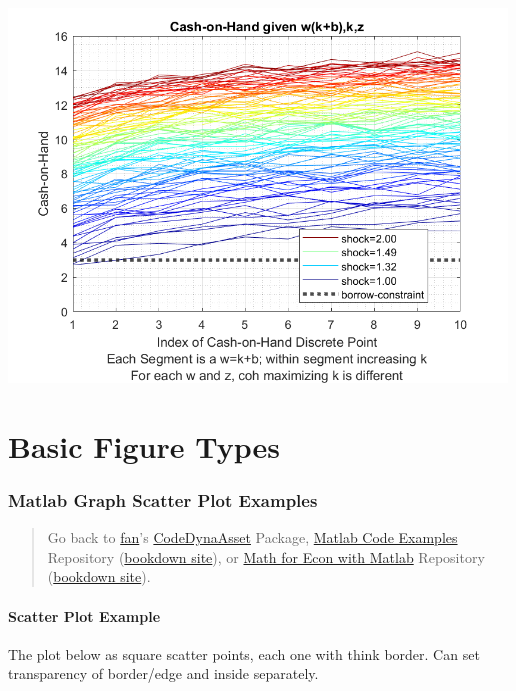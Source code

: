 \documentclass[
]{book}
\begin{document}
\includegraphics[width=5.20833in,height=\textheight]{img/fs_legendsubset_images/figure_0.png}

\hypertarget{basic-figure-types}{%
\section{Basic Figure Types}\label{basic-figure-types}}

\hypertarget{matlab-graph-scatter-plot-examples}{%
\subsubsection{Matlab Graph Scatter Plot Examples}\label{matlab-graph-scatter-plot-examples}}

\begin{quote}
Go back to \href{http://fanwangecon.github.io/}{fan}'s \href{https://fanwangecon.github.io/CodeDynaAsset/}{CodeDynaAsset} Package, \href{https://fanwangecon.github.io/M4Econ/}{Matlab Code Examples} Repository (\href{https://fanwangecon.github.io/M4Econ/bookdown}{bookdown site}), or \href{https://fanwangecon.github.io/Math4Econ/}{Math for Econ with Matlab} Repository (\href{https://fanwangecon.github.io/Math4Econ/bookdown}{bookdown site}).
\end{quote}

\hypertarget{scatter-plot-example}{%
\paragraph{Scatter Plot Example}\label{scatter-plot-example}}

The plot below as square scatter points, each one with think border. Can
set transparency of border/edge and inside separately.
\end{document}

